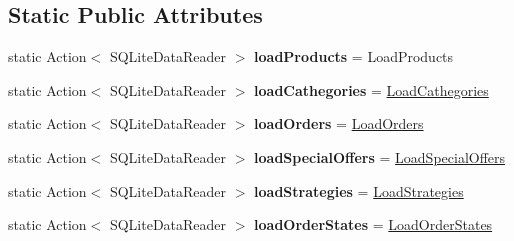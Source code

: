\subsection*{Static Public Attributes}
\begin{DoxyCompactItemize}
\item 
\mbox{\label{class_eshop_1_1_database_ab024b4e6a204818457f8a880e89e6d09}} 
static Action$<$ S\+Q\+Lite\+Data\+Reader $>$ {\bfseries load\+Products} = Load\+Products
\item 
\mbox{\label{class_eshop_1_1_database_a00c5788250e599af4bd23734ba8d090b}} 
static Action$<$ S\+Q\+Lite\+Data\+Reader $>$ {\bfseries load\+Cathegories} = \mbox{\hyperlink{class_eshop_1_1_database_a740a0b27bde20b1000993f96550a570d}{Load\+Cathegories}}
\item 
\mbox{\label{class_eshop_1_1_database_a4439c8d63351dbdd674f46f2bdee4c94}} 
static Action$<$ S\+Q\+Lite\+Data\+Reader $>$ {\bfseries load\+Orders} = \mbox{\hyperlink{class_eshop_1_1_database_ac17365c3ead366345290d2e8919f0e1a}{Load\+Orders}}
\item 
\mbox{\label{class_eshop_1_1_database_a9fa9a57671e1ba37cbe8b003b52fa65c}} 
static Action$<$ S\+Q\+Lite\+Data\+Reader $>$ {\bfseries load\+Special\+Offers} = \mbox{\hyperlink{class_eshop_1_1_database_a329b6c5162884bb8eaa7407c0a0526f3}{Load\+Special\+Offers}}
\item 
\mbox{\label{class_eshop_1_1_database_a37ecbafc413e90c33ad1d60dc4962552}} 
static Action$<$ S\+Q\+Lite\+Data\+Reader $>$ {\bfseries load\+Strategies} = \mbox{\hyperlink{class_eshop_1_1_database_af63f03aac766810014723c21d8798e35}{Load\+Strategies}}
\item 
\mbox{\label{class_eshop_1_1_database_affeb838d01a3c4eddbb31c7b94eacb91}} 
static Action$<$ S\+Q\+Lite\+Data\+Reader $>$ {\bfseries load\+Order\+States} = \mbox{\hyperlink{class_eshop_1_1_database_aa12ddf3915d8952fb6f5e4c87b272444}{Load\+Order\+States}}
\end{DoxyCompactItemize}
